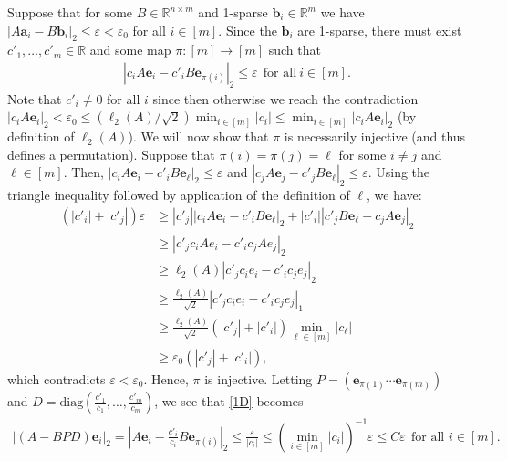 \documentclass[journal, onecolumn]{IEEEtran}
\begin{document}
Suppose that for some $B \in \mathbb{R}^{n \times m}$ and 1-sparse $\mathbf{b}_i \in \mathbb{R}^m$ we have  $|A\mathbf{a}_i - B\mathbf{b}_i|_2 \leq \varepsilon < \varepsilon_0$ for all $i \in [m]$. Since the $\mathbf{b}_i$ are 1-sparse, there must exist $c'_1, \ldots, c'_m \in \mathbb{R}$ and some map $\pi: [m] \to [m]$ such that 
\begin{align}\label{1D}
|c_iA\mathbf{e}_i - c'_iB\mathbf{e}_{\pi(i)}|_2 \leq \varepsilon \ \ \text{for all} \  i \in [m].
\end{align} 
Note that $c'_i \neq 0$ for all $i$ since then otherwise we reach the contradiction $|c_iA\mathbf{e}_i|_2 < \varepsilon_0 \leq (\ell_2(A)/\sqrt{2}) \min_{i \in [m]}|c_i| \leq \min_{i\in [m]}|c_iA\mathbf{e}_i|_2$ (by definition of $\ell_2(A)$). We will now show that $\pi$ is necessarily injective (and thus defines a permutation). Suppose that $\pi(i) = \pi(j) = \ell$ for some $i \neq j$ and $\ell \in [m]$. Then, $|c_iA\mathbf{e}_i - c'_iB\mathbf{e}_{\ell}|_2  \leq \varepsilon$ and $|c_jA\mathbf{e}_j - c'_jB\mathbf{e}_{\ell}|_2 \leq \varepsilon$. Using the triangle inequality followed by application of the definition of $\ell$, we have:
\begin{align*}
(|c'_i| + |c'_j|) \varepsilon
&\geq |c'_j||c_iA\mathbf{e}_i - c'_iB\mathbf{e}_{\ell}|_2 + |c'_i||c'_jB\mathbf{e}_{\ell} - c_jA\mathbf{e}_j|_2 \\
&\geq |c'_jc_iAe_i - c'_ic_jAe_j|_2 \\
&\geq \ell_2(A)|c'_jc_ie_i - c'_ic_je_j|_2 \\
&\geq \frac{\ell_2(A)}{\sqrt{2}}|c'_jc_ie_i - c'_ic_je_j|_1 \\
&\geq \frac{\ell_2(A)}{\sqrt{2}} \left( |c'_j| + |c'_i| \right) \min_{\ell \in [m]} |c_\ell | \\
&\geq \varepsilon_0 \left( |c'_j| + |c'_i| \right),
\end{align*}
%
which contradicts $\varepsilon < \varepsilon_0$. Hence, $\pi$ is injective. Letting $P = \left( \mathbf{e}_{\pi(1)} \cdots \mathbf{e}_{\pi(m)}\right)$ and $D = \text{diag}(\frac{c'_1}{c_1},\ldots,\frac{c'_m}{c_m})$, we see that \eqref{1D} becomes 
\begin{align}
|(A - BPD)\mathbf{e}_i|_2 = |A\mathbf{e}_i - \frac{c'_i}{c_i}B\mathbf{e}_{\pi(i)}|_2 \leq \frac{\varepsilon}{|c_i|} \leq (\min_{i \in [m]} |c_i|)^{-1} \varepsilon \leq C\varepsilon \ \ \text{for all } i \in [m].
\end{align}
\end{document}

